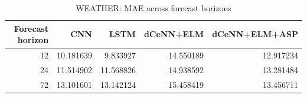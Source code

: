 \begin{table}
\caption{WEATHER: MAE across forecast horizons}
\begin{tabular}{rrrrr}
\toprule
Forecast horizon & CNN & LSTM & dCeNN+ELM & dCeNN+ELM+ASP \\
\midrule
12 & 10.181639 & 9.833927 & 14.550189 & 12.917234 \\
24 & 11.514902 & 11.568826 & 14.938592 & 13.281484 \\
72 & 13.101601 & 13.142124 & 15.458419 & 13.456711 \\
\bottomrule
\end{tabular}
\end{table}
